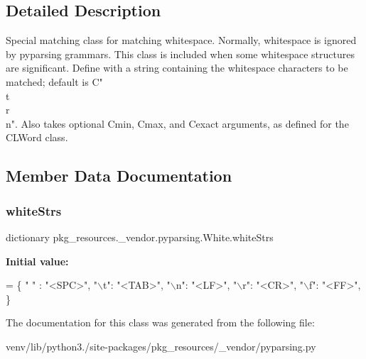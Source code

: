 \subsection{Detailed Description}
\begin{DoxyVerb}Special matching class for matching whitespace.  Normally, whitespace is ignored
by pyparsing grammars.  This class is included when some whitespace structures
are significant.  Define with a string containing the whitespace characters to be
matched; default is C{" \\t\\r\\n"}.  Also takes optional C{min}, C{max}, and C{exact} arguments,
as defined for the C{L{Word}} class.
\end{DoxyVerb}
 

\subsection{Member Data Documentation}
\mbox{\label{classpkg__resources_1_1__vendor_1_1pyparsing_1_1_white_a8e84a2d21ce5e8532c590fa75ac57958}} 
\subsubsection{\texorpdfstring{white\+Strs}{whiteStrs}}
{\footnotesize\ttfamily dictionary pkg\+\_\+resources.\+\_\+vendor.\+pyparsing.\+White.\+white\+Strs\hspace{0.3cm}{\ttfamily [static]}}

{\bfseries Initial value\+:}
\begin{DoxyCode}
=  \{
        \textcolor{stringliteral}{" "} : \textcolor{stringliteral}{"<SPC>"},
        \textcolor{stringliteral}{"\(\backslash\)t"}: \textcolor{stringliteral}{"<TAB>"},
        \textcolor{stringliteral}{"\(\backslash\)n"}: \textcolor{stringliteral}{"<LF>"},
        \textcolor{stringliteral}{"\(\backslash\)r"}: \textcolor{stringliteral}{"<CR>"},
        \textcolor{stringliteral}{"\(\backslash\)f"}: \textcolor{stringliteral}{"<FF>"},
        \}
\end{DoxyCode}


The documentation for this class was generated from the following file\+:\begin{DoxyCompactItemize}
\item 
venv/lib/python3./site-\/packages/pkg\+\_\+resources/\+\_\+vendor/pyparsing.\+py\end{DoxyCompactItemize}
